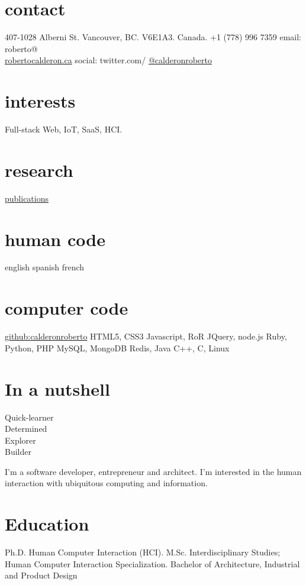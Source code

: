 \documentclass[full]{rvca}
\begin{document}

\begin{aside} %
\section{contact}
407-1028 Alberni St.
Vancouver, BC.
V6E1A3. Canada.
+1 (778) 996 7359
email: roberto@\\\href{http://robertocalderon.ca}{robertocalderon.ca}
social: twitter.com/
\href{http://twitter.com/calderonroberto}{@calderonroberto}
%
\QrCode
\section{interests}
Full-stack Web, IoT, SaaS, HCI.
%
\section{research}
\href{http://robertocalderon.ca/content.php?c=publications}{publications}
%
\section{human code}
english
spanish
french
\section{computer code}
\href{https://github.com/calderonroberto}{github:calderonroberto}
HTML5, CSS3
Javascript, RoR
JQuery, node.js
Ruby, Python, PHP
MySQL, MongoDB
Redis, Java
C++, C, Linux
%
\section{In a nutshell}
Quick-learner\\Determined\\Explorer\\Builder
\end{aside}

\begin{statement}
I'm a software developer, entrepreneur and architect. I'm interested in the human interaction with ubiquitous computing and information.
\end{statement}

\section{Education}
Ph.D. Human Computer Interaction (HCI).
M.Sc. Interdisciplinary Studies;\\Human Computer Interaction Specialization.
Bachelor of Architecture, Industrial and Product Design
\end{document}
